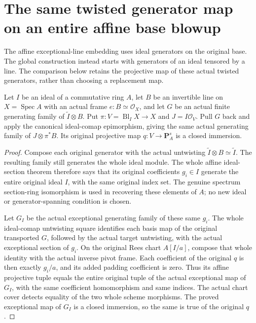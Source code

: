 \section{The same twisted generator map on an entire affine base blowup}

The affine exceptional-line embedding uses ideal generators on the original
base.  The global construction instead starts with generators of an ideal
tensored by a line.  The comparison below retains the projective map of
these actual twisted generators, rather than choosing a replacement map.

\begin{lemma}
\label{lem:kn-nadel-nef-big-framed-affine-pair-closed}
\leanok
{}
Let $I$ be an ideal of a commutative ring $A$, let $B$ be an invertible
line on $X=\operatorname{Spec}A$ with an actual frame
$e:B\simeq\mathcal O_X$, and let $G$ be an actual finite generating
family of $\widetilde I\otimes B$.  Put
$\pi:V=\operatorname{Bl}_I X\to X$ and $J=I\mathcal O_V$.
Pull $G$ back and apply the canonical ideal-comap epimorphism, giving the
same actual generating family of $J\otimes\pi^*B$.  Its original
projective map $q:V\to\mathbf P_A^s$ is a closed immersion.
\end{lemma}
\begin{proof}
Compose each original generator with the actual untwisting
$\widetilde I\otimes B\simeq\widetilde I$.  The resulting family still
generates the whole ideal module.  The whole affine ideal-section theorem
therefore says that its original coefficients $g_i\in I$ generate the
entire original ideal $I$, with the same original index set.  The genuine
spectrum section-ring isomorphism is used in recovering these elements
of $A$; no new ideal or generator-spanning condition is chosen.

Let $G_I$ be the actual exceptional generating family of these same
$g_i$.  The whole ideal-comap untwisting square identifies each basis map
of the original transported $G$, followed by the actual target
untwisting, with the actual exceptional section of $g_i$.  On the original
Rees chart $A[I/a]$, compose that whole identity with the actual inverse
pivot frame.  Each coefficient of the original $q$ is then exactly
$g_i/a$, and its added padding coefficient is zero.  Thus its affine
projective tuple equals the entire original tuple of the actual
exceptional map of $G_I$, with the same coefficient homomorphism and
same indices.  The actual chart cover detects equality of the two whole
scheme morphisms.  The proved exceptional map of $G_I$ is a
closed immersion, so the same is true of the original $q$.
\end{proof}

